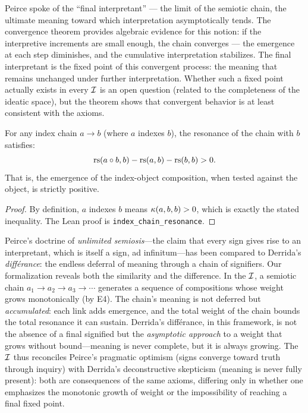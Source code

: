 \begin{interpretation}
Peirce spoke of the ``final interpretant'' --- the limit of the
semiotic chain, the ultimate meaning toward which interpretation
asymptotically tends. The convergence theorem provides algebraic
evidence for this notion: if the interpretive increments are small
enough, the chain converges --- the emergence at each step
diminishes, and the cumulative interpretation stabilizes. The final
interpretant is the fixed point of this convergent process: the
meaning that remains unchanged under further interpretation. Whether
such a fixed point actually exists in every $\mathcal{I}$ is an open question
(related to the completeness of the ideatic space), but the theorem
shows that convergent behavior is at least consistent with the
axioms.
\end{interpretation}

\begin{theorem}
\label{thm:index-chain}
For any index chain $a \to b$ (where $a$ indexes $b$), the resonance of the chain with $b$ satisfies:
\[
  \mathrm{rs}(a \circ b, b) - \mathrm{rs}(a, b) - \mathrm{rs}(b, b) > 0.
\]
That is, the emergence of the index-object composition, when tested against the object, is strictly positive.
\end{theorem}

\begin{proof}
By definition, $a$ indexes $b$ means $\kappa(a, b, b) > 0$, which is exactly the stated inequality. The Lean proof is \texttt{index\_chain\_resonance}.
\end{proof}

\begin{remark}
Peirce's doctrine of \emph{unlimited semiosis}---the claim that every sign gives rise to an interpretant, which is itself a sign, ad infinitum---has been compared to Derrida's \emph{diff\'erance}: the endless deferral of meaning through a chain of signifiers. Our formalization reveals both the similarity and the difference. In the $\mathcal{I}$, a semiotic chain $a_1 \to a_2 \to a_3 \to \cdots$ generates a sequence of compositions whose weight grows monotonically (by E4). The chain's meaning is not deferred but \emph{accumulated}: each link adds emergence, and the total weight of the chain bounds the total resonance it can sustain. Derrida's diff\'erance, in this framework, is not the absence of a final signified but the \emph{asymptotic approach} to a weight that grows without bound---meaning is never complete, but it is always growing. The $\mathcal{I}$ thus reconciles Peirce's pragmatic optimism (signs converge toward truth through inquiry) with Derrida's deconstructive skepticism (meaning is never fully present): both are consequences of the same axioms, differing only in whether one emphasizes the monotonic growth of weight or the impossibility of reaching a final fixed point.
\end{remark}

